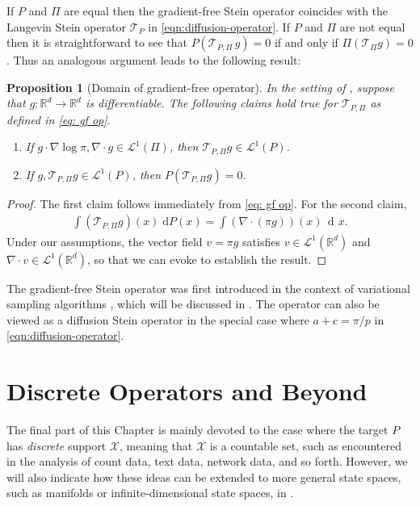 \documentclass[12pt,paper=letter]{scrreprt}
\newtheorem{proposition}{Proposition}[chapter]
\newcommand{\dee}{\mathop{\mathrm{d}\!}}
\newcommand{\dx}{\,\dee x}
\def\reals{\mathbb{R}} %
\newcommand{\grad}{\nabla} %
\newcommand{\xset}[0]{\mathcal{X}} %
\newcommand{\TP}{\mathcal{T}_P}
\begin{document}
\noindent If $P$ and $\Pi$ are equal then the gradient-free Stein operator coincides with the Langevin Stein operator $\TP$ in \cref{eqn:diffusion-operator}.
If $P$ and $\Pi$ are not equal then it is straightforward to see that $P(\mathcal{T}_{P,\Pi} \, g) = 0$ if and only if $\Pi(\mathcal{T}_{\Pi} g) = 0$.
Thus an analogous argument leads to the following result:

\begin{proposition}[Domain of gradient-free operator] \label{cor: domain GF}
In the setting of , suppose that $g : \reals^d \rightarrow \reals^d$ is differentiable.
The following claims hold true for $\mathcal{T}_{P,\Pi}$ as defined in \cref{eq: gf op}.
\begin{enumerate}
\item If $g\cdot \grad \log \pi, \grad \cdot g \in \mathcal{L}^1(\Pi)$, then $\mathcal{T}_{P,\Pi} g \in \mathcal{L}^1(P)$.
\item If $g, \mathcal{T}_{P,\Pi} g \in \mathcal{L}^1(P)$, then $P(\mathcal{T}_{P,\Pi} g) = 0$. 
\end{enumerate}
\end{proposition}
\begin{proof}
The first claim follows immediately from \cref{eq: gf op}.
For the second claim, 
\begin{align*}
\int (\mathcal{T}_{P,\Pi} g)(x) \; \mathrm{d}P(x) 
 = \int (\nabla \cdot (\pi g))(x) \dx .
\end{align*}
Under our assumptions, the vector field $v = \pi g$ satisfies $v \in \mathcal{L}^1(\mathbb{R}^d)$ and $\nabla \cdot v \in \mathcal{L}^1(\mathbb{R}^d)$, so that we can evoke  to establish the result.
\end{proof}


The gradient-free Stein operator was first introduced in the context of variational sampling algorithms \citep{han2018stein}, which will be discussed in .
The operator can also be viewed as a diffusion Stein operator in the special case where $a + c = \pi / p$ in \cref{eqn:diffusion-operator}.





\section{Discrete Operators and Beyond}
\label{sec: discrete operators}

The final part of this Chapter is mainly devoted to the case where the target $P$ has \emph{discrete} support $\xset$, meaning that $\xset$ is a countable set, such as encountered in the analysis of count data, text data, network data, and so forth. 
However, we will also indicate how these ideas can be extended to more general state spaces, such as manifolds or infinite-dimensional state spaces, in .
\end{document}
